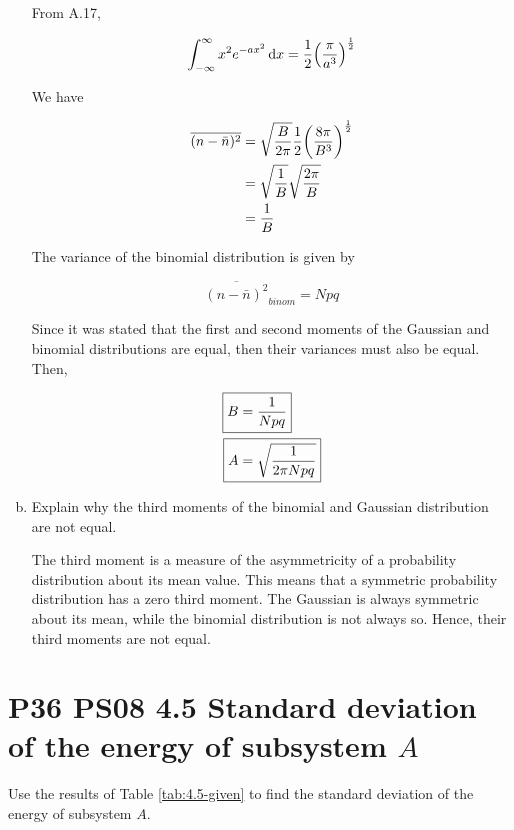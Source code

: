 \documentclass[9pt,a4paper,twocolumn]{article}
\begin{document}
\begin{enumerate}[(a)]
From A.17,

\begin{equation}
	\int_{-\infty}^\infty x^2 e^{-ax^2}\dd{x} = \frac{1}{2}\qty(\frac{\pi}{a^3})^{\frac{1}{2}}
\end{equation}

We have

\begin{align}
	\overline{(n - \bar{n})^2} &= \sqrt{\frac{B}{2\pi}} \frac{1}{2} \qty(\frac{8\pi}{B^3})^{\frac{1}{2}} \\
	&= \sqrt{\frac{1}{B}}\sqrt{\frac{2\pi}{B}} \\
	&= \frac{1}{B}
\end{align}

The variance of the binomial distribution is given by

\begin{equation}
	\overline{(n - \bar{n})^2}_{binom} = Npq
\end{equation}

Since it was stated that the first and second moments of the Gaussian and binomial distributions are equal, then their variances must also be equal. Then,

\begin{align}
	\Aboxed{
		B &= \frac{1}{Npq}
	} \\
	\Aboxed{
		A &= \sqrt{\frac{1}{2\pi Npq}} 
	}
\end{align}

\item Explain why the third moments of the binomial and Gaussian distribution are not equal.

The third moment is a measure of the asymmetricity of a probability distribution about its mean value. This means that a symmetric probability distribution has a zero third moment. The Gaussian is always symmetric about its mean, while the binomial distribution is not always so. Hence, their third moments are not equal.

\end{enumerate}

\section{P36 PS08 4.5 Standard deviation of the energy of subsystem $A$}
Use the results of Table \ref{tab:4.5-given} to find the standard deviation of the energy of subsystem $A$.
\end{document}
